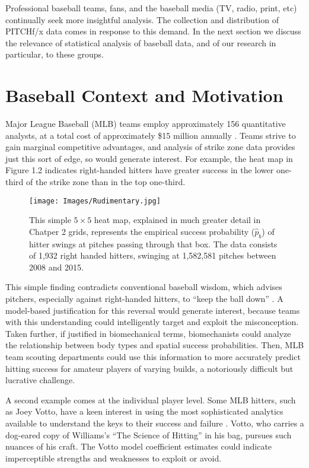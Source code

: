Professional baseball teams, fans, and the baseball media (TV, radio, print, etc)  continually seek more insightful analysis. The collection and distribution of PITCHf/x\textsuperscript{\textregistered} data comes in response to this demand. In the next section we discuss the relevance of statistical analysis of baseball data, and of our research in particular, to these groups.

\section{Baseball Context and Motivation}

Major League Baseball (MLB\textsuperscript{\textregistered}) teams employ approximately 156 quantitative analysts, at a total cost of approximately \$15 million annually \citep{Lindbergh2016}. Teams strive to gain marginal competitive advantages, and analysis of strike zone data provides just this sort of edge, so would generate interest. For example, the heat map in Figure 1.2 indicates right-handed hitters have greater success in the lower one-third of the strike zone than in the top one-third.
        \begin{figure}[H]
      	\centering
      	\texttt{[image: Images/Rudimentary.jpg]} 
      	\caption{This simple $5 \times 5$ heat map, explained in much greater detail in Chatper 2 grids, represents the empirical success probability ($\hat{p}_{b}$) of hitter swings at pitches passing through that box.  The data consists of 1,932 right handed hitters, swinging at 1,582,581 pitches between 2008 and 2015.}
      	\end{figure} 
This simple finding contradicts conventional baseball wisdom, which advises pitchers, especially against right-handed hitters, to ``keep the ball down'' \citep{Stallings2003}. A model-based justification for this reversal would generate interest, because teams with this understanding could intelligently target and exploit the misconception. Taken further, if justified in biomechanical terms, biomechanists could analyze the relationship between body types and spatial success probabilities. Then, MLB\textsuperscript{\textregistered} team scouting departments could use this information to more accurately predict hitting success for amateur players of varying builds, a notoriously difficult but lucrative challenge. 

A second example comes at the individual player level. Some MLB\textsuperscript{\textregistered} hitters, such as Joey Votto, have a keen interest in using the most sophisticated analytics available to understand the keys to their success and failure \citep{Daugherty2015}. Votto, who carries a dog-eared copy of Williams's ``The Science of Hitting'' in his bag, pursues such nuances of his craft. The Votto model coefficient estimates could indicate imperceptible strengths and weaknesses to exploit or avoid. 

